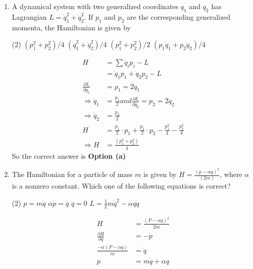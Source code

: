 \begin{enumerate}
\begin{answer}
\end{answer}
	\item  A dynamical system with two generalized coordinates $q_{1}$ and $q_{2}$ has Lagrangian $L=\dot{q}_{1}^{2}+\dot{q}_{2}^{2}$. If $p_{1}$ and $p_{2}$ are the corresponding generalized momenta, the Hamiltonian is given by
	{}
	\begin{tasks}(2)
		\task[\textbf{a.}]$\left(p_{1}^{2}+p_{2}^{2}\right) / 4$
		\task[\textbf{b.}] $\left(\dot{q}_{1}^{2}+\dot{q}_{2}^{2}\right) / 4$
		\task[\textbf{c.}] $\left(p_{1}^{2}+p_{2}^{2}\right) / 2$
		\task[\textbf{d.}]  $\left(p_{1} \dot{q}_{1}+p_{2} \dot{q}_{2}\right) / 4$
	\end{tasks}
\begin{answer}
	\begin{align*}
	H&=\sum \dot{q}_{i} p_{i}-L\\&=\dot{q}_{1} p_{1}+\dot{q}_{2} p_{2}-L\\
	\frac{\partial L}{\partial \dot{q}_{1}}&=p_{1}=2 \dot{q}_{1} \\\Rightarrow \dot{q}_{1}&=\frac{p_{1}}{2} and \frac{\partial L}{\partial \dot{q}_{2}}=p_{2}=2 \dot{q}_{2} \\\Rightarrow \dot{q}_{2}&=\frac{p_{2}}{2}\\
	H&=\frac{p_{1}}{2} \cdot p_{1}+\frac{p_{2}}{2} \cdot p_{2}-\frac{p_{1}^{2}}{4}-\frac{p_{2}^{2}}{4} \\\Rightarrow H&=\frac{\left(p_{1}^{2}+p_{2}^{2}\right)}{4}
	\end{align*}
	So the correct answer is \textbf{Option (a)}
\end{answer}
	\item  The Hamiltonian for a particle of mass $m$ is given by $H=\frac{(p-\alpha q)^{2}}{(2 m)}$, where $\alpha$ is a nonzero constant. Which one of the following equations is correct?
	{}
	\begin{tasks}(2)
		\task[\textbf{a.}]$p=m \dot{q}$
		\task[\textbf{b.}]$\alpha \dot{p}=\dot{q}$
		\task[\textbf{c.}] $\ddot{q}=0$
		\task[\textbf{d.}] $L=\frac{1}{2} m \dot{q}^{2}-\alpha q \dot{q}$
	\end{tasks}
\begin{answer}
	\begin{align*}
	H&=\frac{(P-\alpha q)^{2}}{2 m}\\
	\frac{\partial H}{\partial q}&=-\dot{p} \\
	\frac{-\alpha(P-\alpha q)}{m}&=\dot{q} \\
	p&=m \dot{q}+\alpha q \\

\end{align*}
\end{answer}
\end{enumerate}
